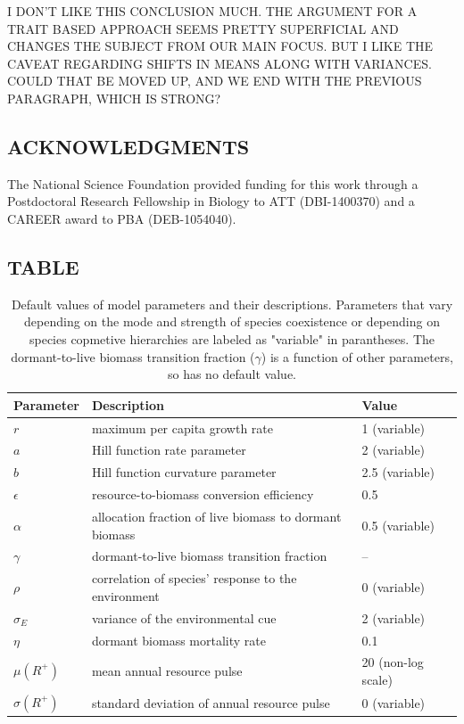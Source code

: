 \documentclass[12pt,]{article}
\begin{document}
I DON'T LIKE THIS CONCLUSION MUCH. THE ARGUMENT FOR A TRAIT BASED
APPROACH SEEMS PRETTY SUPERFICIAL AND CHANGES THE SUBJECT FROM OUR MAIN
FOCUS. BUT I LIKE THE CAVEAT REGARDING SHIFTS IN MEANS ALONG WITH
VARIANCES. COULD THAT BE MOVED UP, AND WE END WITH THE PREVIOUS
PARAGRAPH, WHICH IS STRONG?

\subsection{ACKNOWLEDGMENTS}\label{acknowledgments}

The National Science Foundation provided funding for this work through a
Postdoctoral Research Fellowship in Biology to ATT (DBI-1400370) and a
CAREER award to PBA (DEB-1054040).

\newpage{}

\subsection{TABLE}\label{table}

\begin{table}[!htbp]
\footnotesize
\caption{Default values of model parameters and their descriptions. Parameters that vary depending on the mode and strength of species coexistence or depending on species copmetive hierarchies are labeled as "variable" in parantheses. The dormant-to-live biomass transition fraction ($\gamma$) is a function of other parameters, so has no default value.}
\begin{tabular}{l l l}
\hline
Parameter & Description & Value \\
\hline
$r$ & maximum per capita growth rate & 1 (variable) \\
$a$ & Hill function rate parameter & 2 (variable) \\
$b$ & Hill function curvature parameter & 2.5 (variable) \\
$\epsilon$ & resource-to-biomass conversion efficiency & 0.5 \\
$\alpha$ & allocation fraction of live biomass to dormant biomass & 0.5 (variable) \\
$\gamma$ & dormant-to-live biomass transition fraction & -- \\
$\rho$ & correlation of species' response to the environment & 0 (variable) \\
$\sigma_E$ & variance of the environmental cue & 2 (variable) \\
$\eta$ & dormant biomass mortality rate & 0.1 \\
$\mu(R^+)$ & mean annual resource pulse & 20 (non-log scale) \\
$\sigma(R^+)$ & standard deviation of annual resource pulse & 0 (variable) \\
\hline
\end{tabular}
\end{table}
\end{document}
